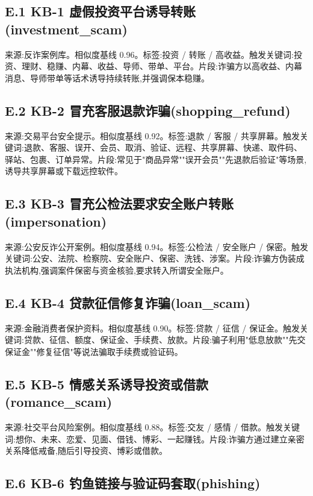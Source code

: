 \documentclass[UTF8,a4paper,12pt]{ctexart}
\begin{document}
\subsection*{E.1 KB-1 虚假投资平台诱导转账(investment\_scam)}

来源:反诈案例库。相似度基线 0.96。标签:投资 / 转账 / 高收益。触发关键词:投资、理财、稳赚、内幕、收益、导师、带单、平台。片段:诈骗方以高收益、内幕消息、导师带单等话术诱导持续转账,并强调保本稳赚。

\subsection*{E.2 KB-2 冒充客服退款诈骗(shopping\_refund)}

来源:交易平台安全提示。相似度基线 0.92。标签:退款 / 客服 / 共享屏幕。触发关键词:退款、客服、误开、会员、取消、验证、远程、共享屏幕、快递、取件码、驿站、包裹、订单异常。片段:常见于"商品异常""误开会员""先退款后验证"等场景,诱导共享屏幕或下载远控软件。

\subsection*{E.3 KB-3 冒充公检法要求安全账户转账(impersonation)}

来源:公安反诈公开案例。相似度基线 0.94。标签:公检法 / 安全账户 / 保密。触发关键词:公安、法院、检察院、安全账户、保密、洗钱、涉案。片段:诈骗方伪装成执法机构,强调案件保密与资金核验,要求转入所谓安全账户。

\subsection*{E.4 KB-4 贷款征信修复诈骗(loan\_scam)}

来源:金融消费者保护资料。相似度基线 0.90。标签:贷款 / 征信 / 保证金。触发关键词:贷款、征信、额度、保证金、手续费、放款。片段:骗子利用"低息放款""先交保证金""修复征信"等说法骗取手续费或验证码。

\subsection*{E.5 KB-5 情感关系诱导投资或借款(romance\_scam)}

来源:社交平台风险案例。相似度基线 0.88。标签:交友 / 感情 / 借款。触发关键词:想你、未来、恋爱、见面、借钱、博彩、一起赚钱。片段:诈骗方通过建立亲密关系降低戒备,随后引导投资、博彩或借款。

\subsection*{E.6 KB-6 钓鱼链接与验证码套取(phishing)}
\end{document}
